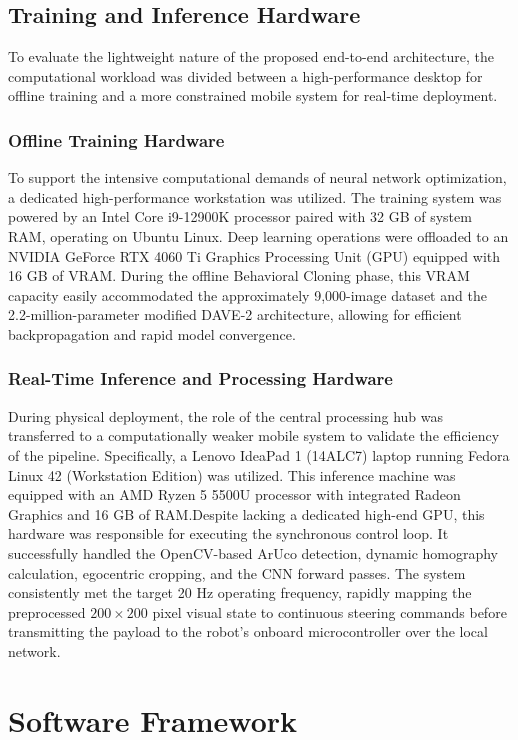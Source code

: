 \subsection{Training and Inference Hardware}
To evaluate the lightweight nature of the proposed end-to-end architecture, the computational workload was divided between a high-performance desktop for offline training and a more constrained mobile system for real-time deployment.

\subsubsection*{Offline Training Hardware}
To support the intensive computational demands of neural network optimization, a dedicated high-performance workstation was utilized. The training system was powered by an Intel Core i9-12900K processor paired with 32 GB of system RAM, operating on Ubuntu Linux. Deep learning operations were offloaded to an NVIDIA GeForce RTX 4060 Ti Graphics Processing Unit (GPU) equipped with 16 GB of VRAM. During the offline Behavioral Cloning phase, this VRAM capacity easily accommodated the approximately 9,000-image dataset and the 2.2-million-parameter modified DAVE-2 architecture, allowing for efficient backpropagation and rapid model convergence.

\subsubsection*{Real-Time Inference and Processing Hardware}
During physical deployment, the role of the central processing hub was transferred to a computationally weaker mobile system to validate the efficiency of the pipeline. Specifically, a Lenovo IdeaPad 1 (14ALC7) laptop running Fedora Linux 42 (Workstation Edition) was utilized. This inference machine was equipped with an AMD Ryzen 5 5500U processor with integrated Radeon Graphics and 16 GB of RAM.Despite lacking a dedicated high-end GPU, this hardware was responsible for executing the synchronous control loop. It successfully handled the OpenCV-based ArUco detection, dynamic homography calculation, egocentric cropping, and the CNN forward passes. The system consistently met the target 20 Hz operating frequency, rapidly mapping the preprocessed $200 \times 200$ pixel visual state to continuous steering commands before transmitting the payload to the robot's onboard microcontroller over the local network.


\section{Software Framework}
